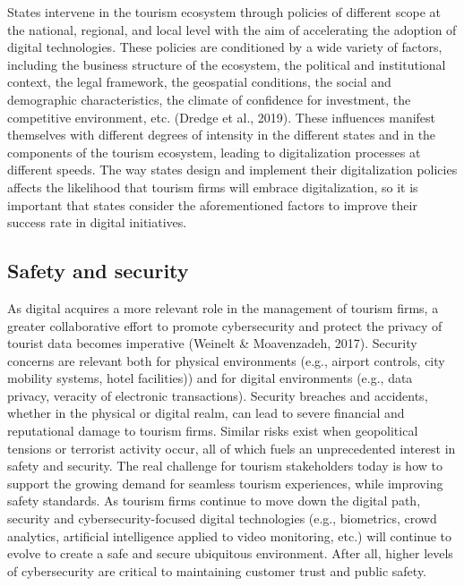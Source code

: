 \documentclass[
  letterpaper,
  DIV=11,
  numbers=noendperiod]{scrreprt}
\begin{document}
States intervene in the tourism ecosystem through policies of different
scope at the national, regional, and local level with the aim of
accelerating the adoption of digital technologies. These policies are
conditioned by a wide variety of factors, including the business
structure of the ecosystem, the political and institutional context, the
legal framework, the geospatial conditions, the social and demographic
characteristics, the climate of confidence for investment, the
competitive environment, etc. (Dredge et al., 2019). These influences
manifest themselves with different degrees of intensity in the different
states and in the components of the tourism ecosystem, leading to
digitalization processes at different speeds. The way states design and
implement their digitalization policies affects the likelihood that
tourism firms will embrace digitalization, so it is important that
states consider the aforementioned factors to improve their success rate
in digital initiatives.

\hypertarget{safety-and-security}{%
\subsection{Safety and security}\label{safety-and-security}}

As digital acquires a more relevant role in the management of tourism
firms, a greater collaborative effort to promote cybersecurity and
protect the privacy of tourist data becomes imperative (Weinelt \&
Moavenzadeh, 2017). Security concerns are relevant both for physical
environments (e.g., airport controls, city mobility systems, hotel
facilities)) and for digital environments (e.g., data privacy, veracity
of electronic transactions). Security breaches and accidents, whether in
the physical or digital realm, can lead to severe financial and
reputational damage to tourism firms. Similar risks exist when
geopolitical tensions or terrorist activity occur, all of which fuels an
unprecedented interest in safety and security. The real challenge for
tourism stakeholders today is how to support the growing demand for
seamless tourism experiences, while improving safety standards. As
tourism firms continue to move down the digital path, security and
cybersecurity-focused digital technologies (e.g., biometrics, crowd
analytics, artificial intelligence applied to video monitoring, etc.)
will continue to evolve to create a safe and secure ubiquitous
environment. After all, higher levels of cybersecurity are critical to
maintaining customer trust and public safety.
\end{document}
